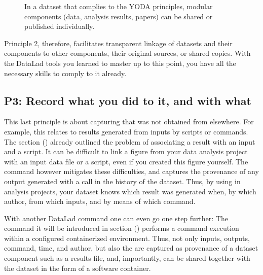 \begin{figure}[tbp]
\centering
\capstart

\noindent{}
\caption{In a dataset that complies to the YODA principles, modular components
(data, analysis results, papers) can be shared or published individually.}\label{\detokenize{basics/101-127-yoda:id7}}\label{\detokenize{basics/101-127-yoda:fig-yodads}}\end{figure}

\sphinxAtStartPar
Principle 2, therefore, facilitates transparent linkage of datasets and their
components to other components, their original sources, or shared copies.
With the DataLad tools you learned to master up to this point,
you have all the necessary skills to comply to it already.


\subsection{P3: Record what you did to it, and with what}
\label{\detokenize{basics/101-127-yoda:p3-record-what-you-did-to-it-and-with-what}}\label{\detokenize{basics/101-127-yoda:p3}}
\sphinxAtStartPar
This last principle is about capturing  that was not obtained from elsewhere. For example,
this relates to results generated from inputs by scripts or commands.
The section {\hyperref[\detokenize{basics/101-108-run:run}]{}} () already outlined the problem of associating
a result with an input and a script. It can be difficult to link a
figure from your data analysis project with an input data file or a
script, even if you created this figure yourself.
The  command however mitigates these difficulties,
and captures the provenance of any output generated with a
 call in the history of the dataset. Thus, by using
 in analysis projects, your dataset knows
which result was generated when, by which author, from which inputs,
and by means of which command.

\sphinxAtStartPar
With another DataLad command one can even go one step further:
The command  \sphinxhyphen{} it will be introduced in
section {\hyperref[\detokenize{basics/101-133-containersrun:containersrun}]{}} () \sphinxhyphen{} performs a command execution within
a configured containerized environment. Thus, not only inputs,
outputs, command, time, and author, but also the 
are captured as provenance of a dataset component such as a results file,
and, importantly, can be shared together with the dataset in the
form of a software container.

